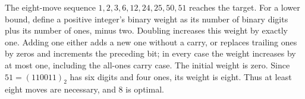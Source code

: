 The eight-move sequence $1,2,3,6,12,24,25,50,51$ reaches the target. For a lower bound, define a positive integer's binary weight as its number of binary digits plus its number of ones, minus two. Doubling increases this weight by exactly one. Adding one either adds a new one without a carry, or replaces trailing ones by zeros and increments the preceding bit; in every case the weight increases by at most one, including the all-ones carry case. The initial weight is zero. Since $51=(110011)_2$ has six digits and four ones, its weight is eight. Thus at least eight moves are necessary, and $\boxed8$ is optimal.
